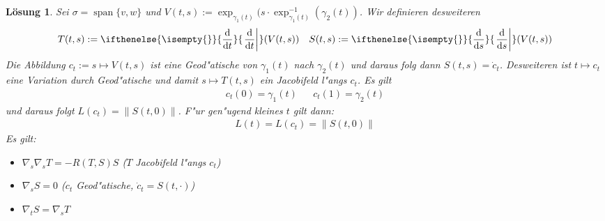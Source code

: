\documentclass[paper=A4, twoside, chapterprefix=true, bibliography=totoc, headsepline]{scrbook}
\newcommand{\dop}{\mathrm{d}}
\newcommand{\difffrac}[3][]{\ifthenelse{\isempty{#1}}{\frac{\dop #2}{\dop #3}}{\left. \frac{\dop #2}{\dop #3} \right|_{#1}}}
\theoremstyle{plain}
\theoremstyle{nonumberplain}
\theoremstyle{empty}
\theoremstyle{break}
\newtheorem{Loes}{L\"osung}
\begin{document}
\begin{Loes}
Sei $\sigma = \mathop{\mathrm{span}}\{v,w\}$ und $V(t,s) := \exp_{\gamma_1(t)} (s \cdot \exp_{\gamma_1(t)}^{-1} (\gamma_2(t))$.
Wir definieren desweiteren
\begin{align*}
	T(t,s) := \difffrac{}{t} (V(t,s)) && S(t,s) := \difffrac{}{s} (V(t,s))
\end{align*}
Die Abbildung $c_t := s \mapsto V(t,s)$ ist eine Geod"atische von $\gamma_1(t)$ nach $\gamma_2(t)$ und daraus folg dann $S(t,s) = \dot c_t$.
Desweiteren ist $t \mapsto c_t$ eine Variation durch Geod"atische und damit $s \mapsto T(t,s)$ ein Jacobifeld l"angs $c_t$.
Es gilt
\begin{align*}
	c_t(0) = \gamma_1(t) && c_t(1) = \gamma_2(t)
\end{align*}
und daraus folgt $L(c_t) = \| S(t,0) \|$. F"ur gen"ugend kleines $t$ gilt dann:
\begin{align*}
	L(t) = L(c_t) = \| S(t,0) \|
\end{align*}
Es gilt:\begin{itemize}
\item
	$\nabla_s \nabla_s T = -R(T,S)S$ ($T$ Jacobifeld l"angs $c_t$)
\item
	$\nabla_s S = 0$ ($c_t$ Geod"atische, $\dot c_t = S(t, \cdot)$)
\item
	$\nabla_t S = \nabla_s T$
\end{itemize}

\end{Loes}
\end{document}
